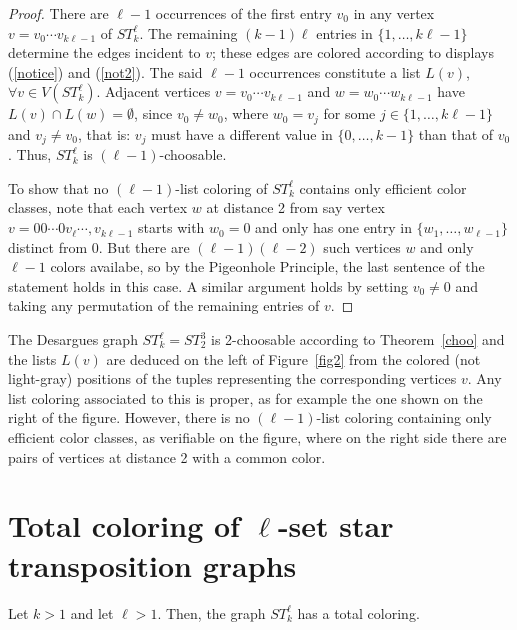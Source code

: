 \documentclass[12pt,reqno]{article}
\begin{document}
\begin{proof}
There are $\ell-1$ occurrences of the first entry $v_0$ in any vertex $v=v_0\cdots v_{k\ell-1}$ of $ST_k^\ell$. The remaining $(k-1)\ell$ entries in $\{1,\ldots,k\ell-1\}$ determine the edges incident to $v$; these edges are colored according to displays (\ref{notice}) and (\ref{not2}). The said $\ell-1$ occurrences constitute a list $L(v)$, $\forall v\in V(ST_k^\ell)$. Adjacent vertices $v=v_0\cdots v_{k\ell-1}$ and $w=w_0\cdots w_{k\ell-1}$ have $L(v)\cap L(w)=\emptyset$, since $v_0\neq w_0$, where $w_0=v_j$ for some $j\in\{1,\dots,k\ell-1\}$ and $v_j\neq v_0$, that is: $v_j$ must have a different value in $\{0,\ldots,k-1\}$ than that of $v_0$. Thus, $ST_k^\ell$ is $(\ell-1)$-choosable.

To show that no $(\ell-1)$-list coloring of $ST_k^\ell$ contains only efficient color classes, note that each vertex $w$ at distance 2 from say vertex $v=00\cdots 0v_\ell\cdots,v_{k\ell-1}$
starts with $w_0=0$ and only has one entry in $\{w_1,\ldots,w_{\ell-1}\}$ distinct from 0. But there are $(\ell-1)(\ell-2)$ such vertices $w$ and only $\ell-1$ colors availabe, so by the Pigeonhole Principle, the last sentence of the statement holds in this case. A similar argument holds by setting $v_0\ne 0$ and taking any permutation of the remaining entries of $v$.
\end{proof}

\begin{example}\label{tax}
The Desargues graph $ST_k^\ell=ST_2^3$ is 2-choosable according to Theorem~\ref{choo} and the lists $L(v)$ are deduced on the left of Figure~\ref{fig2} from the colored (not light-gray) positions of the tuples representing the corresponding vertices $v$. Any list coloring associated to this is proper, as for example the one shown on the right of the figure. 
However, there is no $(\ell-1)$-list coloring containing only efficient color classes, as verifiable on the figure, where on the right side there are pairs of vertices at distance 2 with a common color.
\end{example} 

\section{Total coloring of $\ell$-set star transposition graphs}\label{nuevo}

\begin{theorem}
Let $k>1$ and let $\ell>1$. Then, the graph $ST_k^\ell$ has a total coloring.
\end{theorem}
\end{document}

